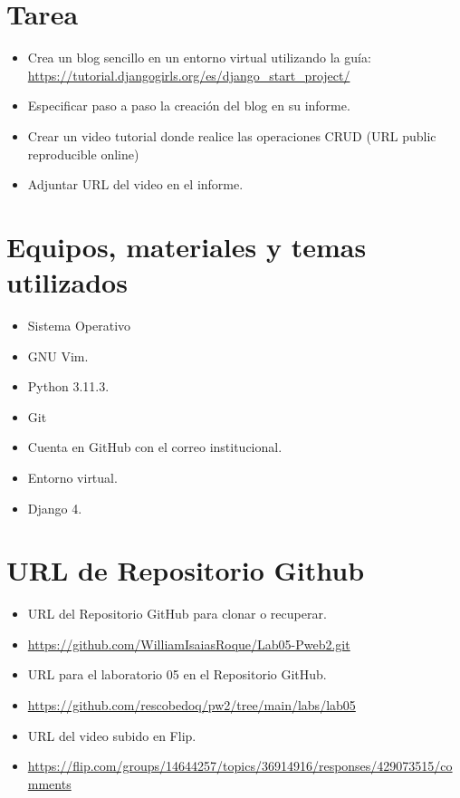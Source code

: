 \documentclass{article}
\begin{document}
	\section{Tarea}
	\begin{itemize}
         \item Crea un blog sencillo en un entorno virtual utilizando la guía: \url{https://tutorial.djangogirls.org/es/django_start_project/}
         \item Especificar paso a paso la creación del blog en su informe.
         \item Crear un video tutorial donde realice las operaciones CRUD (URL public reproducible online)
         \item Adjuntar URL del video en el informe.
         \end{itemize}
		
	\section{Equipos, materiales y temas utilizados}
	\begin{itemize}
		\item Sistema Operativo 
		\item GNU Vim.
		\item Python 3.11.3.
		\item Git
		\item Cuenta en GitHub con el correo institucional.
		\item Entorno virtual.
            \item Django 4.
	\end{itemize}
	
	\section{URL de Repositorio Github}
	\begin{itemize}
		\item URL del Repositorio GitHub para clonar o recuperar.
		\item \url{https://github.com/WilliamIsaiasRoque/Lab05-Pweb2.git}
		\item URL para el laboratorio 05 en el Repositorio GitHub.
		\item \url{https://github.com/rescobedoq/pw2/tree/main/labs/lab05}
            \item URL del video subido en Flip.
            \item \url{https://flip.com/groups/14644257/topics/36914916/responses/429073515/comments}
	\end{itemize}
	
\end{document}
